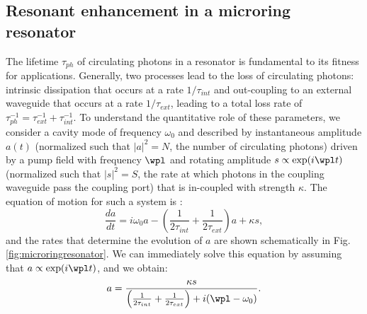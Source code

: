 \subsection{Resonant enhancement in a microring resonator} \label{sec:resenhancement}
 The lifetime $\tau_{ph}$ of circulating photons in a resonator is fundamental to its fitness for applications. Generally, two processes lead to the loss of circulating photons: intrinsic dissipation that occurs at a rate $1/\tau_{int}$ and out-coupling to an external waveguide that occurs at a rate $1/\tau_{ext}$, leading to a total loss rate of $\tau_{ph}^{-1}=\tau_{ext}^{-1}+\tau_{int}^{-1}$. To understand the quantitative role of these parameters, we consider a cavity mode of frequency $\omega_0$ and described by instantaneous amplitude $a(t)$ (normalized such that $|a|^2=N$, the number of circulating photons) driven by a pump field with frequency $\wpl$ and rotating amplitude $s\propto\exp(i\wpl t)$ (normalized such that $|s|^2=S$, the rate at which photons in the coupling waveguide pass the coupling port) that is in-coupled with strength $\kappa$. The equation of motion for such a system is \cite{Haus1984}:
 \begin{equation}
 \frac{d a}{d t}=i\omega_0 a-\left(\frac{1}{2\tau_{int}}+\frac{1}{2\tau_{ext}}\right)a+\kappa s, \label{eq:coupledmotion}
 \end{equation}
 and the rates that determine the evolution of $a$ are shown schematically in Fig. \ref{fig:microringresonator}. We can immediately solve this equation by assuming that $a\propto\exp(i\wpl t)$, and we obtain:
 \begin{equation}
 a=\frac{\kappa s}{\left(\frac{1}{2\tau_{int}}+\frac{1}{2\tau_{ext}}\right)+i(\wpl-\omega_0)}. \label{eq:coupledsoln}
 \end{equation}
 
